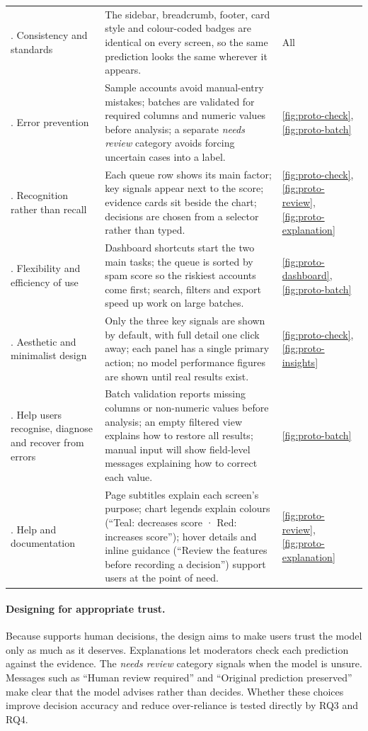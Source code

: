{\begin{longtable}{@{}>{\raggedright\arraybackslash}p{} >{\raggedright\arraybackslash}p{} >{\raggedright\arraybackslash}p{}@{}}
  4. Consistency and standards & The sidebar, breadcrumb, footer, card style and colour-coded badges are identical on every screen, so the same prediction looks the same wherever it appears. & All \\
  5. Error prevention & Sample accounts avoid manual-entry mistakes; batches are validated for required columns and numeric values before analysis; a separate \emph{needs review} category avoids forcing uncertain cases into a label. & \ref{fig:proto-check}, \ref{fig:proto-batch} \\
  6. Recognition rather than recall & Each queue row shows its main factor; key signals appear next to the score; evidence cards sit beside the chart; decisions are chosen from a selector rather than typed. & \ref{fig:proto-check}, \ref{fig:proto-review}, \ref{fig:proto-explanation} \\
  7. Flexibility and efficiency of use & Dashboard shortcuts start the two main tasks; the queue is sorted by spam score so the riskiest accounts come first; search, filters and export speed up work on large batches. & \ref{fig:proto-dashboard}, \ref{fig:proto-batch} \\
  8. Aesthetic and minimalist design & Only the three key signals are shown by default, with full detail one click away; each panel has a single primary action; no model performance figures are shown until real results exist. & \ref{fig:proto-check}, \ref{fig:proto-insights} \\
  9. Help users recognise, diagnose and recover from errors & Batch validation reports missing columns or non-numeric values before analysis; an empty filtered view explains how to restore all results; manual input will show field-level messages explaining how to correct each value. & \ref{fig:proto-batch} \\
  10. Help and documentation & Page subtitles explain each screen's purpose; chart legends explain colours (\enquote{Teal: decreases score · Red: increases score}); hover details and inline guidance (\enquote{Review the features before recording a decision}) support users at the point of need. & \ref{fig:proto-review}, \ref{fig:proto-explanation} \\
\end{longtable}
}

\paragraph{Designing for appropriate trust.} Because \projectname{} supports human decisions, the design aims to make users trust the model only as much as it deserves. Explanations let moderators check each prediction against the evidence. The \emph{needs review} category signals when the model is unsure. Messages such as \enquote{Human review required} and \enquote{Original prediction preserved} make clear that the model advises rather than decides. Whether these choices improve decision accuracy and reduce over-reliance is tested directly by RQ3 and RQ4.

